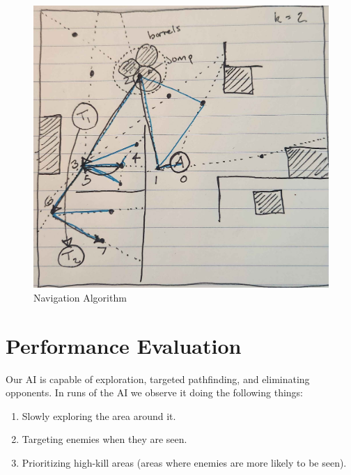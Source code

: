 \documentclass[11pt,a4paper]{article}
\begin{document}
\begin{figure}[H]
    \centering
    \begin{minipage}[b]{0.55\textwidth}
        \centering
        \includegraphics[width=\textwidth]{nav.jpg}
        \caption{Navigation Algorithm}
        \label{fig:three}
    \end{minipage}
\end{figure}

\section{Performance Evaluation}

Our AI is capable of exploration, targeted pathfinding, and eliminating opponents. In runs of the AI we observe it doing the following things:

	\begin{enumerate}
    \item Slowly exploring the area around it.

    \item Targeting enemies when they are seen.

    \item Prioritizing high-kill areas (areas where enemies are more likely to be seen).
	\end{enumerate}
\end{document}
